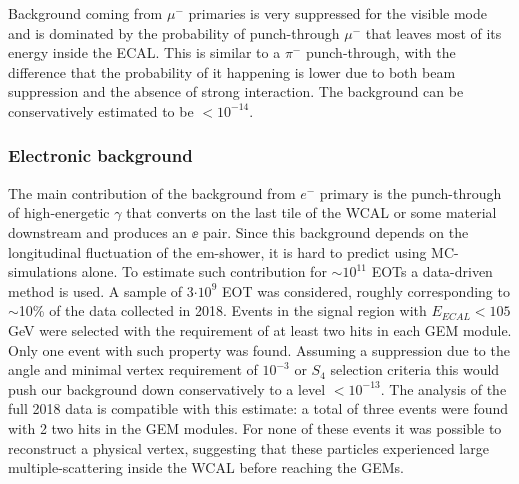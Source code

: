 Background coming from $\mu^-$ primaries is very suppressed for the visible mode and is dominated by the probability of punch-through $\mu^-$ that leaves most of its energy inside the ECAL. This is similar to a $\pi^-$ punch-through, with the difference that the probability of it happening is lower due to both beam suppression and the absence of strong interaction. The background can be conservatively estimated to be $<10^{-14}$.

\subsubsection{Electronic background}
\label{ch3:sec:bkg:vis:elec}

The main contribution of the background from $e^-$ primary is the punch-through of high-energetic $\gamma$ that converts on the last tile of the WCAL or some material downstream and produces an $\ee$ pair. Since this background depends on the longitudinal fluctuation of the em-shower, it is hard to predict using MC-simulations alone. To estimate such contribution for $\sim10^{11}$ EOTs a data-driven method is used. A sample of 3$\cdot 10^9$ EOT was considered, roughly corresponding to $\sim$10\% of the data collected in 2018. Events in the signal region with $E_{ECAL} < 105$ GeV were selected with the requirement of at least two hits in each GEM module. Only one event with such property was found. Assuming a suppression due to the angle and minimal vertex requirement of $10^{-3}$ or $S_4$ selection criteria this would push our background down conservatively to a level $<10^{-13}$. The analysis of the full 2018 data is compatible with this estimate: a total of three events were found with 2 two hits in the GEM modules. For none of these events it was possible to reconstruct a physical vertex, suggesting that these particles experienced large multiple-scattering inside the WCAL before reaching the GEMs.


